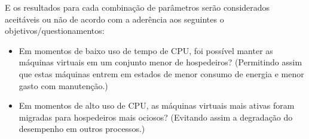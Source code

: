 
E os resultados para cada combinação de parâmetros serão considerados
aceitáveis ou não de acordo com a aderência aos seguintes o
objetivos/questionamentos:
\begin{itemize}
  \item Em momentos de baixo uso de tempo de CPU, foi possível manter as
        máquinas virtuais em um conjunto menor de hospedeiros? (Permitindo
        assim que estas máquinas entrem em estados de menor consumo de
        energia e menor gasto com manutenção.)
  \item Em momentos de alto uso de CPU, as máquinas virtuais mais ativas
        foram migradas para hospedeiros mais ociosos? (Evitando assim a
        degradação do desempenho em outros processos.)
\end{itemize}
